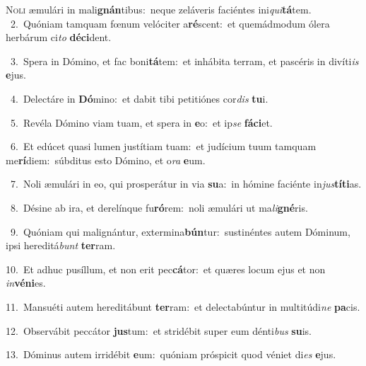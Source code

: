 \lettrine{\initial\textcolor{\initialcolor}{N}}{oli} æmulári in mali\-\textbf{gnán}\-tibus:~\star neque zeláveris faciéntes ini\-\textit{qui}\-\textbf{tá}tem.\\
{\numbfont\textcolor{\numbcolor}{~2.}}~Quóniam tamquam fœnum velóciter a\-\textbf{ré}\-scent:~\star et quemádmodum ólera herbárum ci\textit{to} \textbf{dé}\-\textbf{ci}dent.\par
{\numbfont\textcolor{\numbcolor}{~3.}}~Spera in Dómino, et fac boni\-\textbf{tá}\-tem:~\star et inhábita terram, et pascéris in divíti\textit{is} \textbf{e}\-jus.\par
{\numbfont\textcolor{\numbcolor}{~4.}}~Delectáre in \textbf{Dó}\-mino:~\star et dabit tibi petitiónes cor\textit{dis} \textbf{tu}\-i.\par
{\numbfont\textcolor{\numbcolor}{~5.}}~Revéla Dómino viam tuam, et spera in \textbf{e}\-o:~\star et ip\textit{se} \textbf{fá}\-\textbf{ci}et.\par
{\numbfont\textcolor{\numbcolor}{~6.}}~Et edúcet quasi lumen justítiam tuam:~\dagger et judícium tuum tamquam me\-\textbf{rí}\-diem:~\star súbditus esto Dómino, et o\textit{ra} \textbf{e}\-um.\par
{\numbfont\textcolor{\numbcolor}{~7.}}~Noli æmulári in eo, qui prosperátur in via \textbf{su}\-a:~\star in hómine faciénte in\-\textit{jus}\-\textbf{tí}\textbf{ti}as.\par
{\numbfont\textcolor{\numbcolor}{~8.}}~Désine ab ira, et derelínque fu\-\textbf{ró}\-rem:~\star noli æmulári ut ma\-\textit{li}\-\textbf{gné}ris.\par
{\numbfont\textcolor{\numbcolor}{~9.}}~Quóniam qui malignántur, extermina\-\textbf{bún}\-tur:~\star sustinéntes autem Dóminum, ipsi hereditá\textit{bunt} \textbf{ter}\-ram.\par
{\numbfont\textcolor{\numbcolor}{10.}}~Et adhuc pusíllum, et non erit pec\-\textbf{cá}\-tor:~\star et quæres locum ejus et non \textit{in}\-\textbf{vé}\textbf{ni}es.\par
{\numbfont\textcolor{\numbcolor}{11.}}~Mansuéti autem hereditábunt \textbf{ter}\-ram:~\star et delectabúntur in multitúdi\textit{ne} \textbf{pa}\-cis.\par
{\numbfont\textcolor{\numbcolor}{12.}}~Observábit peccátor \textbf{jus}\-tum:~\star et stridébit super eum dénti\textit{bus} \textbf{su}\-is.\par
{\numbfont\textcolor{\numbcolor}{13.}}~Dóminus autem irridébit \textbf{e}\-um:~\star quóniam próspicit quod véniet di\textit{es} \textbf{e}\-jus.\par
